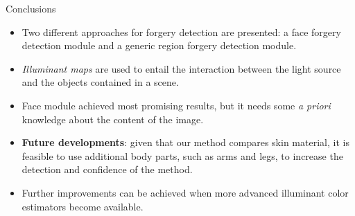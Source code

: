 \begin{tframe}{Conclusions}
\begin{itemize}
\vspace{0.1cm}
\item Two different approaches for forgery detection are presented: a face forgery detection module and a generic region forgery detection module.
\vspace{0.1cm}
\item \emph{Illuminant maps} are used to entail the interaction between the light source and the objects contained in a scene.
\vspace{0.1cm}
\item Face module achieved most promising results, but it needs some \emph{a priori} knowledge about the content of the image.
\vspace{0.1cm}
\item \textbf{Future developments}: given that our method compares skin material, it is feasible to use additional body parts, such as arms and legs, to increase the detection and confidence of the method.
\vspace{0.1cm}
\item Further improvements can be achieved when more advanced illuminant color estimators become available.
\end{itemize}
\end{tframe}

